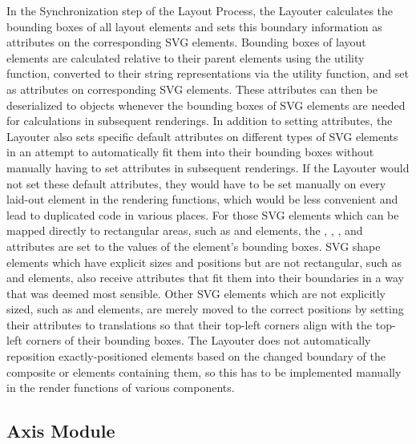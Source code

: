 In the Synchronization step of the Layout Process, the Layouter
calculates the bounding boxes of all layout elements and sets this
boundary information as attributes on the corresponding SVG
elements. Bounding boxes of layout elements are calculated relative to
their parent elements using the  utility
function, converted to their string representations via the
 utility function, and set as 
attributes on corresponding SVG elements.  These 
attributes can then be deserialized to  objects whenever
the bounding boxes of SVG elements are needed for calculations in
subsequent renderings. In addition to setting 
attributes, the Layouter also sets specific default attributes on
different types of SVG elements in an attempt to automatically fit
them into their bounding boxes without manually having to set
attributes in subsequent renderings. If the Layouter would not set
these default attributes, they would have to be set manually on every
laid-out element in the rendering functions, which would be less
convenient and lead to duplicated code in various places. For those
SVG elements which can be mapped directly to rectangular areas, such
as  and  elements, the ,
, , and  attributes are
set to the values of the element's bounding boxes. SVG shape elements
which have explicit sizes and positions but are not rectangular, such
as  and  elements, also receive
attributes that fit them into their boundaries in a way that was
deemed most sensible. Other SVG elements which are not explicitly
sized, such as  and  elements, are merely
moved to the correct positions by setting their 
attributes to translations so that their top-left corners align with
the top-left corners of their bounding boxes. The Layouter does not
automatically reposition exactly-positioned elements based on the
changed boundary of the composite  or 
elements containing them, so this has to be implemented manually in
the render functions of various components.









\subsection{Axis Module}

